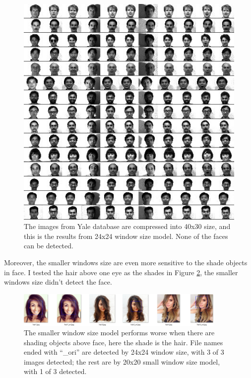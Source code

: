 \documentclass[10pt,twocolumn,letterpaper]{article}
\begin{document}
\begin{figure}[t]
    \begin{center}
        \includegraphics[width=0.9\linewidth]{yaleallsmall_ori}
    \end{center}
    \caption{The images from Yale database are compressed into 40x30 size, and this is the results from 24x24 window size model. None of the faces can be detected.}
    \label{fig:yori}
\end{figure}

Moreover, the smaller windows size are even more sensitive to the shade objects in face.
I tested the hair above one eye as the shades in Figure \ref{fig:hair}, the smaller windows size didn't detect the face.

\begin{figure}
    \begin{center}
        \includegraphics[width=0.9\textwidth]{hairstyle}
    \end{center}
    \caption{The smaller window size model performs worse when there are shading objects above face, here the shade is the hair.
    File names ended with ``\_ori'' are detected by 24x24 window size, with 3 of 3 images detected; the rest are by 20x20 small window size model, with 1 of 3 detected.}
    \label{fig:hair}
\end{figure}
\end{document}
